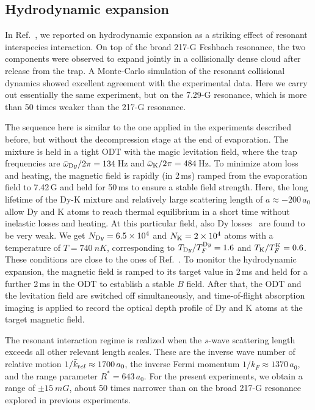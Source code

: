 \subsection{\label{sec:HydExp}Hydrodynamic expansion}

In Ref.~\cite{Ravensbergen2020rif}, we reported on hydrodynamic expansion as a striking effect of resonant interspecies interaction. On top of the broad 217-G Feshbach resonance, the two components were observed to expand jointly in a collisionally dense cloud after release from the trap. A Monte-Carlo simulation of the resonant collisional dynamics showed excellent agreement with the experimental data. Here we carry out essentially the same experiment, but on the 7.29-G resonance, which is more than 50 times weaker than the 217-G resonance.

The sequence here is similar to the one applied in the experiments described before, but without the decompression stage at the end of evaporation. The mixture is held in a tight ODT with the magic levitation field, where the trap frequencies are $\bar{\omega}_{\textrm Dy}/2\pi=134$\,\si{Hz} and $\bar{\omega}_{\textrm K}/2\pi=484$\,\si{Hz}. To minimize atom loss and heating, the magnetic field is rapidly (in 2\,ms) ramped from the evaporation field to 7.42\,G and held for 50\,ms to ensure a stable field strength. Here, the long lifetime of the Dy-K mixture and relatively large scattering length of $a\approx-200\,a_0$ allow Dy and K atoms to reach thermal equilibrium in a short time without inelastic losses and heating. {At this particular field, also Dy losses~\cite{Soave2022lff} are found to be very weak.} We get $N_{\textrm Dy}=6.5\times10^4$ and $N_{\textrm K}=2\times10^4$ atoms with a temperature of $T=\SI{740}{nK}$, corresponding to $T_{\textrm Dy}/T_F^{\textrm Dy}=1.6$ and $T_{\textrm K}/T_F^{\textrm K}=0.6$. These conditions are close to the ones of Ref.~\cite{Ravensbergen2020rif}. To monitor the hydrodynamic expansion, the magnetic field is ramped to its target value in 2\,ms and held for a further 2\,ms in the ODT to establish a stable $B$ field. After that, the ODT and the levitation field are switched off simultaneously, and time-of-flight absorption imaging is applied to record the optical depth profile of Dy and K atoms at the target magnetic field.

The resonant interaction regime is realized when the $s$-wave scattering length exceeds all other relevant length scales. These are the inverse wave number of relative motion $1/\bar{k}_{\textrm rel}\approx1700\,a_0$, the inverse Fermi momentum $1/k_{F}\approx1370\,a_0$, and the range parameter $R^*=643\,a_0$. For the present experiments, we obtain a range of $\pm\SI{15}{mG}$, about 50 times narrower than on the broad 217-G resonance explored in previous experiments.

